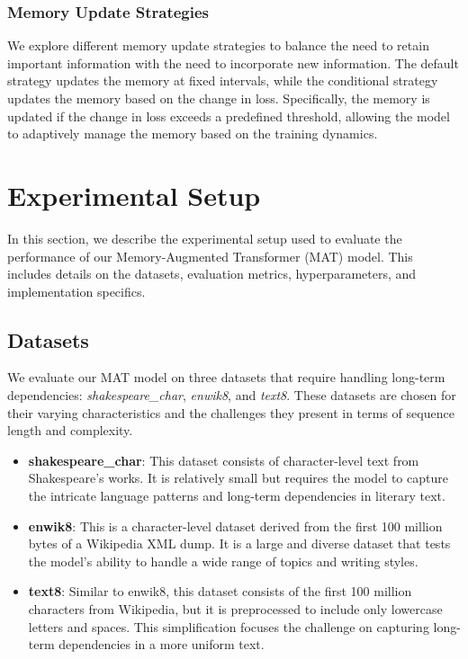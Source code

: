 \documentclass{article} %
\begin{document}
\subsubsection{Memory Update Strategies}
We explore different memory update strategies to balance the need to retain important information with the need to incorporate new information. The default strategy updates the memory at fixed intervals, while the conditional strategy updates the memory based on the change in loss. Specifically, the memory is updated if the change in loss exceeds a predefined threshold, allowing the model to adaptively manage the memory based on the training dynamics.

\section{Experimental Setup}
\label{sec:experimental}

In this section, we describe the experimental setup used to evaluate the performance of our Memory-Augmented Transformer (MAT) model. This includes details on the datasets, evaluation metrics, hyperparameters, and implementation specifics.

\subsection{Datasets}
We evaluate our MAT model on three datasets that require handling long-term dependencies: \textit{shakespeare\_char}, \textit{enwik8}, and \textit{text8}. These datasets are chosen for their varying characteristics and the challenges they present in terms of sequence length and complexity.

\begin{itemize}
    \item \textbf{shakespeare\_char}: This dataset consists of character-level text from Shakespeare's works. It is relatively small but requires the model to capture the intricate language patterns and long-term dependencies in literary text.
    \item \textbf{enwik8}: This is a character-level dataset derived from the first 100 million bytes of a Wikipedia XML dump. It is a large and diverse dataset that tests the model's ability to handle a wide range of topics and writing styles.
    \item \textbf{text8}: Similar to enwik8, this dataset consists of the first 100 million characters from Wikipedia, but it is preprocessed to include only lowercase letters and spaces. This simplification focuses the challenge on capturing long-term dependencies in a more uniform text.
\end{itemize}
\end{document}
